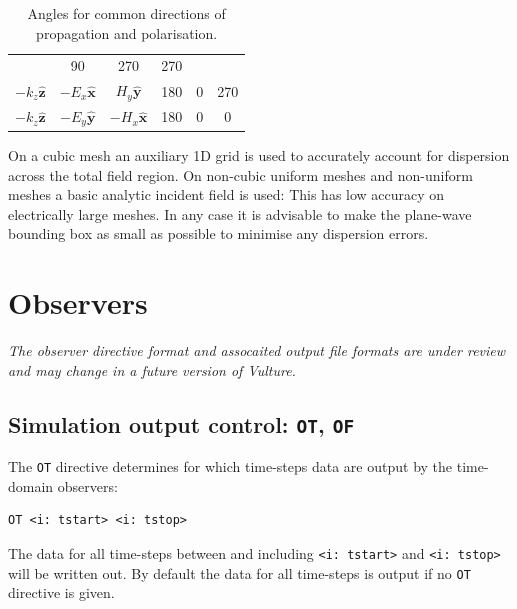 \documentclass[onecolumn,a4paper]{article}
\numberwithin{equation}{section}
\begin{document}
\begin{table}[ht]
\begin{center}
\begin{tabular}{|c|c|c|c|c|c|}
&90                             &270                             &270                             \\
$-k_z \hat{\mathbf{z}}$         &$-E_x \hat{\mathbf{x}}$         &$H_y \hat{\mathbf{y}}$    
&180                            &0                               &270                             \\
$-k_z \hat{\mathbf{z}}$         &$-E_y \hat{\mathbf{y}}$         &$-H_x \hat{\mathbf{x}}$    
&180                            &0                               &0                               \\
\hline
\end{tabular}
\caption{\label{tb:pwangles}Angles for common directions of propagation and polarisation.}
\end{center}
\end{table}

On a cubic mesh an auxiliary 1D grid is used to accurately account for dispersion across the total field
region. On non-cubic uniform meshes and non-uniform meshes a basic analytic incident field is used: This 
has low accuracy on electrically large meshes. In any case it is advisable to make the plane-wave bounding
box as small as possible to minimise any dispersion errors.

%
%
\section{Observers}
\label{sc:obs}
%
%

{\color{red}\it The observer directive format and assocaited output file formats are under review and may change in a future version of Vulture.}

\subsection{Simulation output control: \texttt{OT}, \texttt{OF}}

The \texttt{OT} directive determines for which time-steps data are output by the time-domain observers:
\begin{verbatim}
OT <i: tstart> <i: tstop>
\end{verbatim}
The data for all time-steps between and including  \texttt{<i:~tstart>} and  \texttt{<i:~tstop>} will be
written out. By default the data for all time-steps is output if no \texttt{OT} directive is given.
\end{document}
